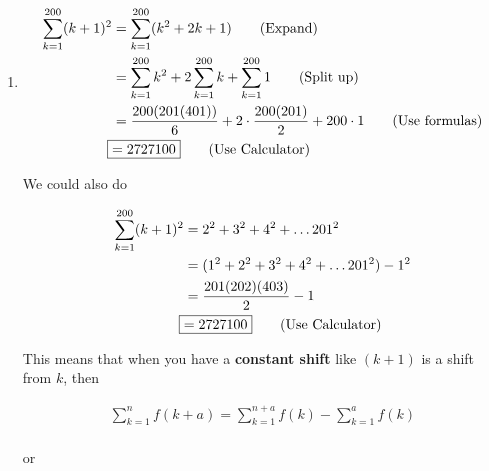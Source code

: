 \documentclass[../../Main.tex]{subfiles}
\begin{document}
\begin{example}
\begin{enumerate}
\begin{note}
            \begin{align*}
                \sum_{k = 1}^{n} ca_k &= c \sum_{k = 1}^{n} a_k \tag{Factor out constants} \\
                \sum_{k = 1}^{n} (a_k + b_k) &= \sum_{k = 1}^{n} a_k + \sum_{k = 1}^{n} b_k \tag{Split} \\
            \end{align*}
        \end{note}

        \item 
            \begin{align*}
                \sum_{k = 1}^{200} (k + 1)^2 &= \sum_{k = 1}^{200} (k^2 + 2k + 1) \tag{Expand} \\
                &= \sum_{k = 1}^{200} k^2 + 2 \sum_{k = 1}^{200} k + \sum_{k = 1}^{200} 1 \tag{Split up} \\
                &= \frac{200(201(401))}{6} + 2 \cdot \frac{200(201)}{2} + 200 \cdot 1 \tag{Use formulas} \\
                \Aboxed{&= 2727100} \tag{Use Calculator} \\ 
            \end{align*}

            We could also do

            \begin{align*}
                \sum_{k = 1}^{200} (k + 1)^2 &= 2^2 + 3^2 + 4^2 + \ldots 201^2 \\
                &= (1^2 + 2^2 + 3^2 + 4^2 + \ldots 201^2) - 1^2 \\
                &= \frac{201(202)(403)}{2} - 1 \\
                \Aboxed{&= 2727100} \tag{Use Calculator} \\ 
            \end{align*}

        \begin{theorem}
            This means that when you have a \textbf{constant shift} like $(k + 1)$ is a shift from $k$, then

            \begin{align*}
                \sum_{k = 1}^{n} f(k + a) = \sum_{k = 1}^{n + a} f(k) - \sum_{k = 1}^{a} f(k) \\
            \end{align*}

            \begin{center}
                or
            \end{center}


\end{theorem}
\end{enumerate}
\end{example}
\end{document}
